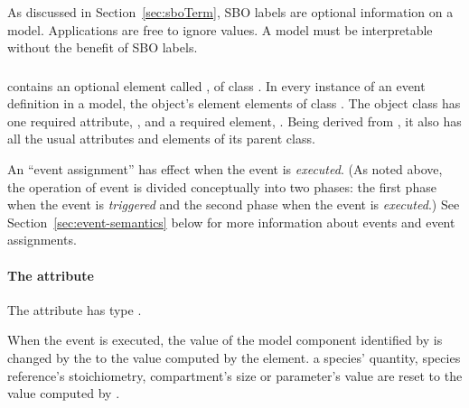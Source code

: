 As discussed in Section~\ref{sec:sboTerm}, SBO labels are optional
information on a model.  Applications are free to ignore
 values.  A model must be interpretable without the
benefit of SBO labels.


\subsubsection{}
\label{sec:eventassignment}
\label{sec:listofeventassignments}

\Event contains an optional element called
, of class \ListOfEventAssignments.
In every instance of an event definition in a model, the object's
 element   elements of class
\EventAssignment.  The object class \EventAssignment has one
required attribute, , and a required element,
.  Being derived from \SBase, it also has all the
usual attributes and elements of its parent class.

An ``event assignment'' has effect when the event is
\emph{executed}.  (As noted above, the operation of event is
divided conceptually into two phases: the first phase when the
event is \emph{triggered} and the second phase when the event is
\emph{executed}.)  See Section~\ref{sec:event-semantics} below for
more information about events and event assignments.


\paragraph{The  attribute}

The \EventAssignment attribute  has type .

When the event is executed, the value of
the model component identified by  is changed by
the \EventAssignment to the value computed by the 
element.   a species' quantity, species reference's
stoichiometry, compartment's size or parameter's value are reset
to the value computed by .

